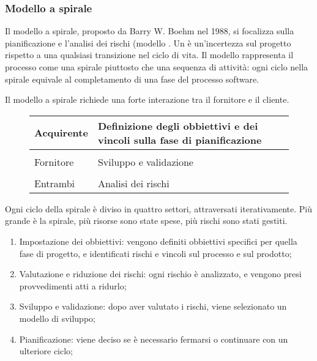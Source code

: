 \subsubsection{Modello a spirale}

Il modello a spirale, proposto da Barry W. Boehm nel 1988, si focalizza sulla
pianificazione e l'analisi dei rischi (modello . Un
 è un'incertezza sul progetto rispetto a una qualsiasi
transizione nel ciclo di vita. Il modello rappresenta il processo come una
spirale piuttosto che una sequenza di attività: ogni ciclo nella spirale
equivale al completamento di una fase del processo software.


Il modello a spirale richiede una forte interazione tra il fornitore e il
cliente.

\begin{figure}[h!]
	\centering
	\begin{tabular}{|l|l|}
		\hline
    Acquirente & Definizione degli obbiettivi e dei vincoli sulla fase di
    pianificazione \\
		\hline \\
		Fornitore & Sviluppo e validazione \\
		\hline \\
		Entrambi & Analisi dei rischi \\
		\hline
	\end{tabular}
\end{figure}

Ogni ciclo della spirale è diviso in quattro settori, attraversati
iterativamente. Più grande è la spirale, più risorse sono state spese, più
rischi sono stati gestiti.

\begin{enumerate}
  \item Impostazione dei obbiettivi: vengono definiti obbiettivi specifici per
    quella fase di progetto, e identificati rischi e vincoli sul processo e sul
    prodotto;
  \item Valutazione e riduzione dei rischi: ogni rischio è analizzato, e vengono
    presi provvedimenti atti a ridurlo;
  \item Sviluppo e validazione: dopo aver valutato i rischi, viene selezionato
    un modello di sviluppo;
  \item Pianificazione: viene deciso se è necessario fermarsi o continuare con
    un ulteriore ciclo;
\end{enumerate}


